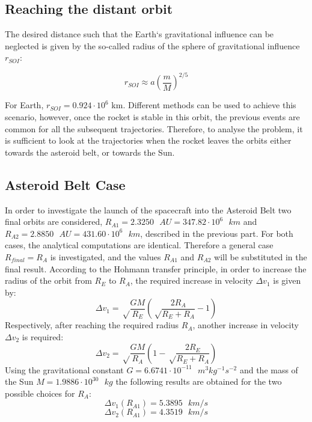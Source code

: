 \documentclass[onecolumn,12pt]{article}
\numberwithin{equation}{section}
\begin{document}
\subsection{Reaching the distant orbit}

The desired distance such that the Earth`s gravitational influence can be neglected is given by the so-called radius of the sphere of gravitational influence $r_{SOI}$:

\begin{equation}
     r_{SOI} \approx a \left( \frac{m}{M}\right)^{2/5}
     \label{rSOI}
\end{equation}

For Earth, $r_{SOI}=0.924 \cdot 10^6$ km. Different methods can be used to achieve this scenario, however, once the rocket is stable in this orbit, the previous events are common for all the subsequent trajectories. Therefore, to analyse the problem, it is sufficient to look at the trajectories when the rocket leaves the orbits either towards the asteroid belt, or towards the Sun.

\subsection{Asteroid Belt Case}
In order to investigate the launch of the spacecraft into the Asteroid Belt two final orbits are considered, $R_{A1} =  2.3250 \text{ }AU = 347.82 \cdot 10^6 \text{ }km$ and $R_{A2} = 2.8850 \text{ } AU = 431.60 \cdot 10^6 \text{ }km$, described in the previous part. For both cases, the analytical computations are identical. Therefore a general case $R_{final}=R_A$ is investigated, and the values $R_{A1}$ and $R_{A2}$ will be substituted in the final result. According to the Hohmann transfer principle, in order to increase the radius of the orbit from $R_E$ to $R_A$, the required increase in velocity $\Delta v_1$  is given by: 
\begin{equation}
    \Delta v_1 = \sqrt\frac{GM}{R_E}\left( \sqrt\frac{2R_A}{R_E+R_A}-1\right)
\end{equation}
Respectively, after reaching the required radius $R_A$, another increase in velocity $\Delta v_2$ is required:
\begin{equation}
    \Delta v_2 = \sqrt\frac{GM}{R_A}\left( 1-\sqrt\frac{2R_E}{R_E+R_A}\right) 
\end{equation}
Using the gravitational constant $G = 6.6741 \cdot 10^{-11} \text{ }m^3 kg^{-1} s^{-2}$ and the mass of the Sun $ M = 1.9886 \cdot 10^{30} \text{ } kg$ the following results are obtained for the two possible choices for $R_A$:
\begin{equation}
    \Delta v_1 (R_{A1}) =  5.3895 \text{ } km/s
\end{equation}
\begin{equation}
    \Delta v_2 (R_{A1}) = 4.3519 \text{ } km/s
\end{equation}
\end{document}
